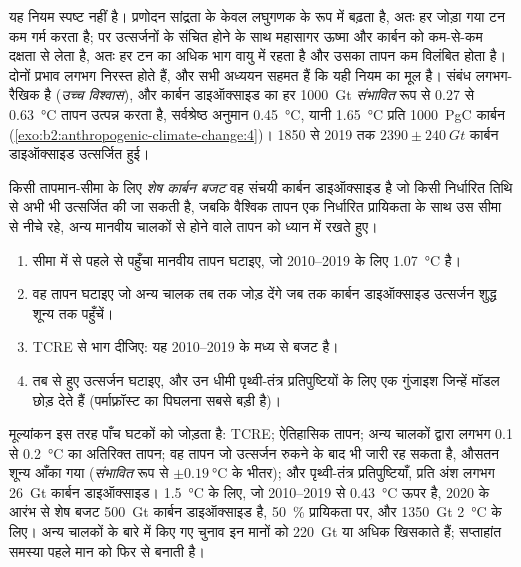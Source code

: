 यह नियम स्पष्ट नहीं है। प्रणोदन सांद्रता के केवल लघुगणक के रूप में बढ़ता है, अतः हर
जोड़ा गया टन कम गर्म करता है; पर उत्सर्जनों के संचित होने के साथ महासागर ऊष्मा और कार्बन को कम-से-कम
दक्षता से लेता है, अतः हर टन का अधिक भाग वायु में रहता है और उसका तापन कम विलंबित होता है।
दोनों प्रभाव लगभग निरस्त होते हैं, और सभी अध्ययन सहमत हैं कि यही नियम का मूल है। संबंध
लगभग-रैखिक है (\emph{उच्च विश्वास}), और कार्बन डाइऑक्साइड का हर \qty{1000}{Gt} \emph{संभावित} रूप से
0.27 से \qty{0.63}{\celsius} तापन उत्पन्न करता है, सर्वश्रेष्ठ अनुमान \qty{0.45}{\celsius}, यानी
\qty{1.65}{\celsius} प्रति \qty{1000}{PgC} कार्बन (\cref{exo:b2:anthropogenic-climate-change:4})। 1850 से 2019 तक
$\num{2390} \pm \qty{240}{Gt}$ कार्बन डाइऑक्साइड उत्सर्जित हुई।

\begin{definition}[शेष कार्बन बजट]\label{def:b2:anthropogenic-climate-change:budget}
किसी तापमान-सीमा के लिए \emph{शेष कार्बन बजट} वह संचयी कार्बन डाइऑक्साइड
है जो किसी निर्धारित तिथि से अभी भी उत्सर्जित की जा सकती है, जबकि वैश्विक तापन एक निर्धारित प्रायिकता के साथ
उस सीमा से नीचे रहे, अन्य मानवीय चालकों से होने वाले तापन को
ध्यान में रखते हुए।
\end{definition}

\begin{method}\label{met:b2:anthropogenic-climate-change:budget}
\begin{enumerate}
  \item सीमा में से पहले से पहुँचा मानवीय तापन घटाइए, जो 2010--2019 के लिए
        \qty{1.07}{\celsius} है।
  \item वह तापन घटाइए जो अन्य चालक तब तक जोड़ देंगे जब तक कार्बन डाइऑक्साइड उत्सर्जन
        शुद्ध शून्य तक पहुँचें।
  \item TCRE से भाग दीजिए: यह 2010--2019 के मध्य से बजट है।
  \item तब से हुए उत्सर्जन घटाइए, और उन धीमी पृथ्वी-तंत्र प्रतिपुष्टियों के लिए एक गुंजाइश जिन्हें
        मॉडल छोड़ देते हैं (पर्माफ़्रॉस्ट का पिघलना सबसे बड़ी है)।
\end{enumerate}
\end{method}

मूल्यांकन इस तरह पाँच घटकों को जोड़ता है: TCRE; ऐतिहासिक तापन; अन्य चालकों द्वारा लगभग 0.1 से
\qty{0.2}{\celsius} का अतिरिक्त तापन; वह तापन जो उत्सर्जन रुकने के बाद भी जारी रह सकता है, औसतन शून्य
आँका गया (\emph{संभावित} रूप से $\pm
\qty{0.19}{\celsius}$ के भीतर); और पृथ्वी-तंत्र प्रतिपुष्टियाँ, प्रति अंश लगभग \qty{26}{Gt} कार्बन डाइऑक्साइड।
\qty{1.5}{\celsius} के लिए, जो 2010--2019 से \qty{0.43}{\celsius} ऊपर है, 2020 के आरंभ से शेष बजट
\qty{500}{Gt} कार्बन डाइऑक्साइड है, \qty{50}{\percent} प्रायिकता पर, और
\qty{1350}{Gt} \qty{2}{\celsius} के लिए। अन्य चालकों के बारे में किए गए चुनाव इन मानों को
\qty{220}{Gt} या अधिक खिसकाते हैं; सप्ताहांत समस्या पहले मान को फिर से बनाती है।

